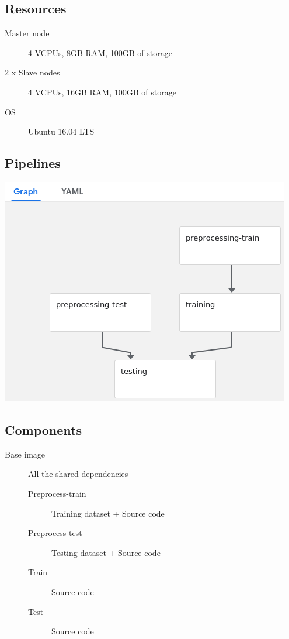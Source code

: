 \documentclass[11pt]{article}
\begin{document}
\subsection*{Resources}
\label{sec:org144acd4}
\begin{description}
\item[{Master node}] 4 VCPUs, 8GB RAM, 100GB of storage
\item[{2 x Slave nodes}] 4 VCPUs, 16GB RAM, 100GB of storage
\item[{OS}] Ubuntu 16.04 LTS
\end{description}
\subsection*{Pipelines}
\label{sec:org8381b5d}
\begin{center}
\includegraphics[width=.9\linewidth]{./img/pipeline.png}
\end{center}
\subsection*{Components}
\label{sec:org1a37ef4}
\begin{description}
\item[{Base image}] All the shared dependencies
\begin{description}
\item[{Preprocess-train}] Training dataset + Source code
\item[{Preprocess-test}] Testing dataset + Source code
\item[{Train}] Source code
\item[{Test}] Source code
\end{description}
\end{description}
\end{document}
